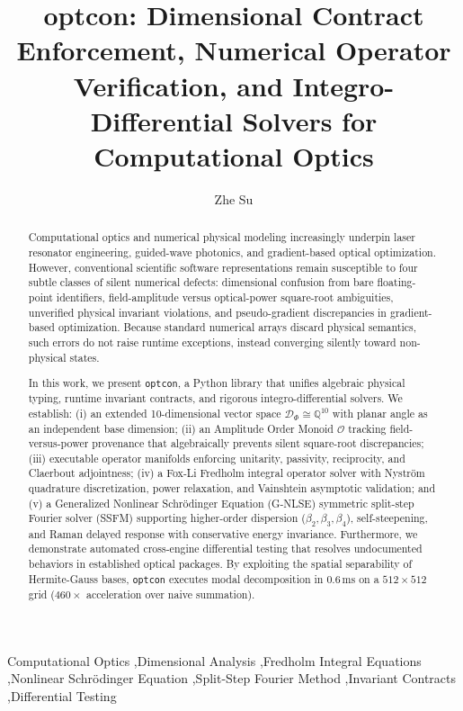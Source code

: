 \documentclass[preprint,12pt]{elsarticle}
\begin{document}
\begin{frontmatter}

\title{optcon: Dimensional Contract Enforcement, Numerical Operator Verification, and Integro-Differential Solvers for Computational Optics}

\author{Zhe Su}
\address{Research School of Physics, The Australian National University, Canberra, ACT 2601, Australia}

\begin{abstract}
Computational optics and numerical physical modeling increasingly underpin laser resonator engineering, guided-wave photonics, and gradient-based optical optimization. However, conventional scientific software representations remain susceptible to four subtle classes of silent numerical defects: dimensional confusion from bare floating-point identifiers, field-amplitude versus optical-power square-root ambiguities, unverified physical invariant violations, and pseudo-gradient discrepancies in gradient-based optimization. Because standard numerical arrays discard physical semantics, such errors do not raise runtime exceptions, instead converging silently toward non-physical states.

In this work, we present \texttt{optcon}, a Python library that unifies algebraic physical typing, runtime invariant contracts, and rigorous integro-differential solvers. We establish: (i) an extended 10-dimensional vector space $\mathcal{D}_\Phi \cong \mathbb{Q}^{10}$ with planar angle as an independent base dimension; (ii) an Amplitude Order Monoid $\mathcal{O}$ tracking field-versus-power provenance that algebraically prevents silent square-root discrepancies; (iii) executable operator manifolds enforcing unitarity, passivity, reciprocity, and Claerbout adjointness; (iv) a Fox-Li Fredholm integral operator solver with Nystr\"om quadrature discretization, power relaxation, and Vainshtein asymptotic validation; and (v) a Generalized Nonlinear Schr\"odinger Equation (G-NLSE) symmetric split-step Fourier solver (SSFM) supporting higher-order dispersion ($\beta_2, \beta_3, \beta_4$), self-steepening, and Raman delayed response with conservative energy invariance. Furthermore, we demonstrate automated cross-engine differential testing that resolves undocumented behaviors in established optical packages. By exploiting the spatial separability of Hermite-Gauss bases, \texttt{optcon} executes modal decomposition in $0.6\,\mathrm{ms}$ on a $512 \times 512$ grid ($460\times$ acceleration over naive summation).
\end{abstract}

\begin{keyword}
Computational Optics \sep Dimensional Analysis \sep Fredholm Integral Equations \sep Nonlinear Schr\"odinger Equation \sep Split-Step Fourier Method \sep Invariant Contracts \sep Differential Testing
\end{keyword}

\end{frontmatter}
\end{document}
